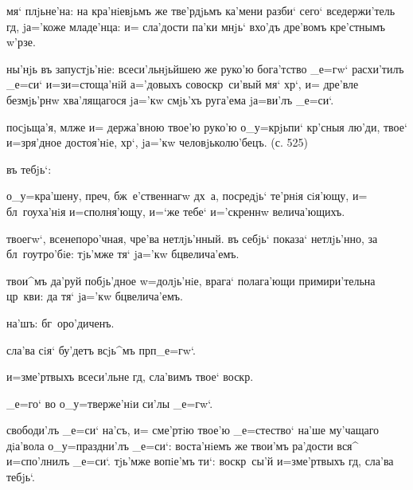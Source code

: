 
мя` плjьне'на: на кра'нiевjьмъ же тве'рдjьмъ ка'мени 
разби` сего` вседержи'тель гд, jа='коже младе'нца: и= 
сла'дости па'ки мнjь` вхо'дъ дре'вомъ кре'стнымъ 
w'рзе.

ны'нjь въ запустjь'нiе: всеси'льнjьйшею же руко'ю 
бога'тство _е=гw` расхи'тилъ _е=си` и=з\ъ и=стоща'нiй 
а='довыхъ совоскр~си'вый мя` хр`, и= дре'вле 
безмjь'рнw хва'лящагося jа='кw смjь'хъ руга'ема jа=ви'лъ 
_е=си`.

посjьща'я, мл же и= держа'вною твое'ю руко'ю 
о_у=крjьпи` кр'сныя лю'ди, твое` и=зря'дное 
достоя'нiе, хр`, jа='кw человjьколю'бецъ. (с. 525)

въ тебjь`:

о_у=кра'шену, преч, бж~е'ственнагw дх~а, посредjь` 
те'рнiя сiя'ющу, и= бл~гоуха'нiя и=сполня'ющу, и=`же 
тебе` и='скреннw велича'ющихъ.

твоегw`, всенепоро'чная, чре'ва нетлjь'нный. въ себjь` 
показа` нетлjь'нно, за бл~гоутро'бiе: тjь'мже тя` jа='кw 
бц велича'емъ.

твои^мъ да'руй побjь'дное w=долjь'нiе, врага` полага'ющи 
примири'тельна цр~кви: да тя` jа='кw бц велича'емъ.

на'шъ: %
бг~оро'диченъ.%


сла'ва сiя` бу'детъ всjь^мъ прп _е=гw`.

и=з\ъ ме'ртвыхъ всеси'льне гд, сла'вимъ твое` 
воскр.

_е=го` во о_у=тверже'нiи си'лы _е=гw`.

свободи'лъ _е=си` на'съ, и= сме'ртiю твое'ю _е=стество` 
на'ше му'чащаго дiа'вола о_у=праздни'лъ _е=си`: 
воста'нiемъ же твои'мъ ра'дости вся^ и=спо'лнилъ _е=си`. 
тjь'мже вопiе'мъ ти`: воскр~сы'й и=з\ъ ме'ртвыхъ гд, 
сла'ва тебjь`.

